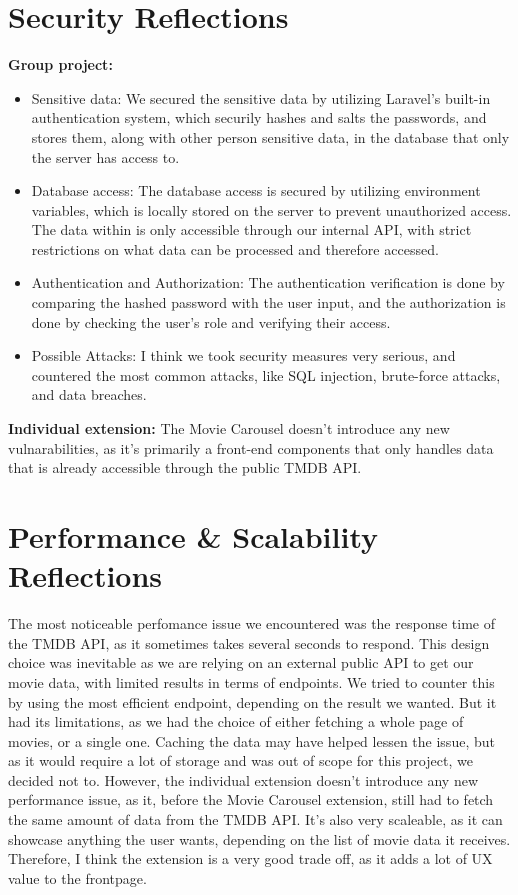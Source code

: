 \documentclass[letterpaper,twocolumn]{article}
\begin{document}
\section{Security Reflections}
\textbf{Group project:}
\begin{itemize}
  \item Sensitive data: We secured the sensitive data by utilizing Laravel's built-in authentication system, which securily hashes and salts the passwords, and stores them, along with other person sensitive data, in the database that only the server has access to. 
  \item Database access: The database access is secured by utilizing environment variables, which is locally stored on the server to prevent unauthorized access. The data within is only accessible through our internal API, with strict restrictions on what data can be processed and therefore accessed.
  \item Authentication and Authorization: The authentication verification is done by comparing the hashed password with the user input, and the authorization is done by checking the user's role and verifying their access.
  \item Possible Attacks: I think we took security measures very serious, and countered the most common attacks, like SQL injection, brute-force attacks, and data breaches.
\end{itemize}
\textbf{Individual extension:}
The Movie Carousel doesn't introduce any new vulnarabilities, as it's primarily a front-end components that only handles data that is already accessible through the public TMDB API.

\section{Performance & Scalability Reflections}
The most noticeable perfomance issue we encountered was the response time of the TMDB API, as it sometimes takes several seconds to respond. This design choice was inevitable as we are relying on an external public API to get our movie data, with limited results in terms of endpoints.
We tried to counter this by using the most efficient endpoint, depending on the result we wanted. But it had its limitations, as we had the choice of either fetching a whole page of movies, or a single one.
Caching the data may have helped lessen the issue, but as it would require a lot of storage and was out of scope for this project, we decided not to.
However, the individual extension doesn't introduce any new performance issue, as it, before the Movie Carousel extension, still had to fetch the same amount of data from the TMDB API. It's also very scaleable, as it can showcase anything the user wants, depending on the list of movie data it receives. Therefore, I think the extension is a very good trade off, as it adds a lot of UX value to the frontpage.
\end{document}
